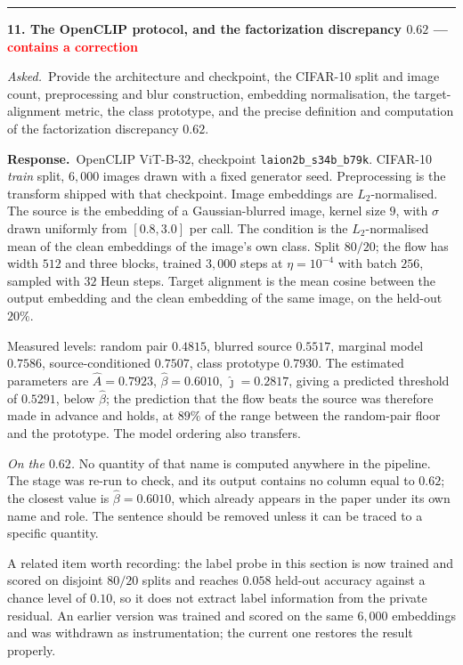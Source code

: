 \documentclass[11pt]{article}
\newenvironment{item12}[1]{%
  \par\medskip\noindent\rule{\textwidth}{0.7pt}\par\nobreak\smallskip
  \noindent\textbf{\large #1}\par\nobreak\smallskip
}{\par\medskip}
\newcommand{\ask}[1]{\noindent\emph{Asked.}\ #1\par\smallskip}
\newcommand{\resp}{\noindent\textbf{Response.}\ }
\begin{document}
\begin{item12}{11. The OpenCLIP protocol, and the factorization discrepancy $0.62$
\;---\; \textcolor{red}{contains a correction}}
\ask{Provide the architecture and checkpoint, the CIFAR-10 split and image count, preprocessing
and blur construction, embedding normalisation, the target-alignment metric, the class prototype,
and the precise definition and computation of the factorization discrepancy $0.62$.}

\resp OpenCLIP ViT-B-32, checkpoint \texttt{laion2b\_s34b\_b79k}. CIFAR-10 \emph{train} split,
$6{,}000$ images drawn with a fixed generator seed. Preprocessing is the transform shipped with
that checkpoint. Image embeddings are $L_2$-normalised. The source is the embedding of a
Gaussian-blurred image, kernel size $9$, with $\sigma$ drawn uniformly from $[0.8,3.0]$ per call.
The condition is the $L_2$-normalised mean of the clean embeddings of the image's own class.
Split $80/20$; the flow has width $512$ and three blocks, trained $3{,}000$ steps at
$\eta=10^{-4}$ with batch $256$, sampled with $32$ Heun steps. Target alignment is the mean
cosine between the output embedding and the clean embedding of the same image, on the held-out
$20\%$.

Measured levels: random pair $0.4815$, blurred source $0.5517$, marginal model $0.7586$,
source-conditioned $0.7507$, class prototype $0.7930$. The estimated parameters are
$\hat A=0.7923$, $\hat\beta=0.6010$, $\hat\jmath=0.2817$, giving a predicted threshold of
$0.5291$, below $\hat\beta$; the prediction that the flow beats the source was therefore made in
advance and holds, at $89\%$ of the range between the random-pair floor and the prototype. The
model ordering also transfers.

\emph{On the $0.62$.} No quantity of that name is computed anywhere in the pipeline. The stage
was re-run to check, and its output contains no column equal to $0.62$; the closest value is
$\hat\beta=0.6010$, which already appears in the paper under its own name and role. The sentence
should be removed unless it can be traced to a specific quantity.

A related item worth recording: the label probe in this section is now trained and scored on
disjoint $80/20$ splits and reaches $0.058$ held-out accuracy against a chance level of $0.10$,
so it does not extract label information from the private residual. An earlier version was
trained and scored on the same $6{,}000$ embeddings and was withdrawn as instrumentation; the
current one restores the result properly.
\end{item12}
\end{document}
